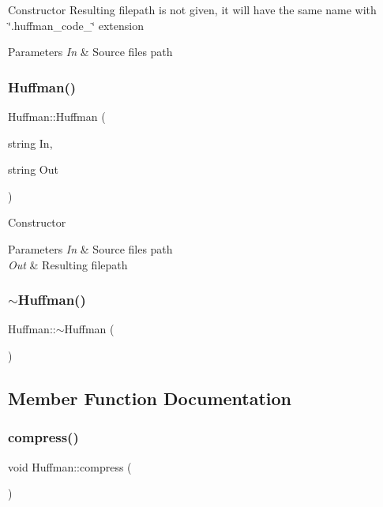 Constructor Resulting filepath is not given, it will have the same name with \char`\"{}.\+huffman_code_\char`\"{} extension
\begin{DoxyParams}{Parameters}
{\em In} & Source file\textquotesingle{}s path \\
\hline
\end{DoxyParams}
\mbox{\label{class_huffman_a340d5fe63ee0b2e66319cfa2b3adf07e}} 
\subsubsection{Huffman()\hspace{0.1cm}{\footnotesize\ttfamily [2/2]}}
{\footnotesize\ttfamily Huffman\+::\+Huffman (\begin{DoxyParamCaption}\item[{string}]{In,  }\item[{string}]{Out }\end{DoxyParamCaption})}

Constructor 
\begin{DoxyParams}{Parameters}
{\em In} & Source file\textquotesingle{}s path \\
\hline
{\em Out} & Resulting filepath \\
\hline
\end{DoxyParams}
\mbox{\label{class_huffman_a641376a7cb5871a6a2c7b51afb05bfcc}} 
\subsubsection{$\sim$\+Huffman()}
{\footnotesize\ttfamily Huffman\+::$\sim$\+Huffman (\begin{DoxyParamCaption}{ }\end{DoxyParamCaption})}



\subsection{Member Function Documentation}
\mbox{\label{class_huffman_a29b0ed4581235dae876fca58dd9bf06f}} 
\subsubsection{compress()}
{\footnotesize\ttfamily void Huffman\+::compress (\begin{DoxyParamCaption}{ }\end{DoxyParamCaption})}


